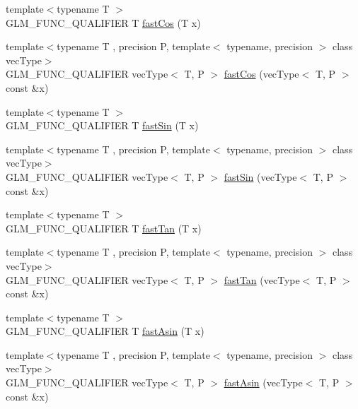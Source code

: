 \begin{DoxyCompactItemize}
\item 
{\footnotesize template$<$typename T $>$ }\\G\+L\+M\+\_\+\+F\+U\+N\+C\+\_\+\+Q\+U\+A\+L\+I\+F\+I\+E\+R T \hyperlink{group__gtx__fast__trigonometry_gab34c8b45c23c0165a64dcecfcc3b302a}{fast\+Cos} (T x)
\item 
{\footnotesize template$<$typename T , precision P, template$<$ typename, precision $>$ class vec\+Type$>$ }\\G\+L\+M\+\_\+\+F\+U\+N\+C\+\_\+\+Q\+U\+A\+L\+I\+F\+I\+E\+R vec\+Type$<$ T, P $>$ \hyperlink{namespaceglm_a6a378691e2e5a984d2ad9b256c87961b}{fast\+Cos} (vec\+Type$<$ T, P $>$ const \&x)
\item 
{\footnotesize template$<$typename T $>$ }\\G\+L\+M\+\_\+\+F\+U\+N\+C\+\_\+\+Q\+U\+A\+L\+I\+F\+I\+E\+R T \hyperlink{group__gtx__fast__trigonometry_ga0aab3257bb3b628d10a1e0483e2c6915}{fast\+Sin} (T x)
\item 
{\footnotesize template$<$typename T , precision P, template$<$ typename, precision $>$ class vec\+Type$>$ }\\G\+L\+M\+\_\+\+F\+U\+N\+C\+\_\+\+Q\+U\+A\+L\+I\+F\+I\+E\+R vec\+Type$<$ T, P $>$ \hyperlink{namespaceglm_a80a1ff93a0918b400dfb41a7f8842974}{fast\+Sin} (vec\+Type$<$ T, P $>$ const \&x)
\item 
{\footnotesize template$<$typename T $>$ }\\G\+L\+M\+\_\+\+F\+U\+N\+C\+\_\+\+Q\+U\+A\+L\+I\+F\+I\+E\+R T \hyperlink{group__gtx__fast__trigonometry_gaf29b9c1101a10007b4f79ee89df27ba2}{fast\+Tan} (T x)
\item 
{\footnotesize template$<$typename T , precision P, template$<$ typename, precision $>$ class vec\+Type$>$ }\\G\+L\+M\+\_\+\+F\+U\+N\+C\+\_\+\+Q\+U\+A\+L\+I\+F\+I\+E\+R vec\+Type$<$ T, P $>$ \hyperlink{namespaceglm_ab443760a1fea463f298e522fd11974dd}{fast\+Tan} (vec\+Type$<$ T, P $>$ const \&x)
\item 
{\footnotesize template$<$typename T $>$ }\\G\+L\+M\+\_\+\+F\+U\+N\+C\+\_\+\+Q\+U\+A\+L\+I\+F\+I\+E\+R T \hyperlink{group__gtx__fast__trigonometry_ga562cb62c51fbfe7fac7db0bce706b81f}{fast\+Asin} (T x)
\item 
{\footnotesize template$<$typename T , precision P, template$<$ typename, precision $>$ class vec\+Type$>$ }\\G\+L\+M\+\_\+\+F\+U\+N\+C\+\_\+\+Q\+U\+A\+L\+I\+F\+I\+E\+R vec\+Type$<$ T, P $>$ \hyperlink{namespaceglm_a5421346d5e7544a997ad0c9ec40456f7}{fast\+Asin} (vec\+Type$<$ T, P $>$ const \&x)

\end{DoxyCompactItemize}
